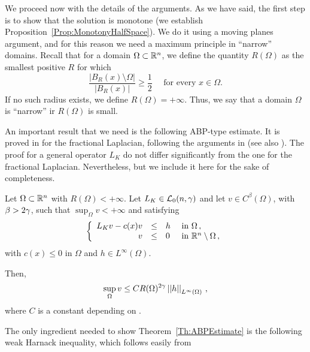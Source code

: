 We proceed now with the details of the arguments. As we have said, the first step is to show that the solution is monotone (we establish Proposition~\ref{Prop:MonotonyHalfSpace}). We do it using a moving planes argument, and for this reason we need a maximum principle in ``narrow'' domains. Recall that for a domain $\Omega \subset \mathbb{R}^n$, we define the quantity $R(\Omega)$ as the smallest positive $R$ for which
$$
\dfrac{|B_R(x)\setminus \Omega|}{|B_R(x)|}\geq \dfrac{1}{2} \quad \text{ for every } x \in \Omega.
$$
If no such radius exists, we define $R(\Omega) = +\infty$. Thus, we say that a domain $\Omega$ is ``narrow'' ir $R(\Omega)$ is small.


An important result that we need is the following ABP-type estimate. It is proved in \cite{QuaasXia} for the fractional Laplacian, following the arguments in \cite{Cabre-ABP} (see also \cite{Cabre-Topics}). The proof for a general operator $L_K$ do not differ significantly from the one for the fractional Laplacian. Nevertheless, but we include it here for the sake of completeness.

\begin{theorem}
	\label{Th:ABPEstimate}
	Let $\Omega \subset \mathbb{R}^n$ with $R(\Omega) < +\infty$. Let $L_K \in \mathcal{L}_0(n,\gamma)$ and let $v\in C^{\beta}(\Omega)$, with $\beta > 2\gamma$, such that $\sup_{\Omega} v < +\infty$ and satisfying
	$$
	\left\{\begin{array}{rcll}
	L_K v - c(x)v &\leq & h & \text{ in } \Omega\,, \\
	v & \leq & 0 & \text{ in } \mathbb{R}^n\setminus \Omega\,,
	\end{array} \right.
	$$
	with $c(x)\leq 0$ in $\Omega$ and $h\in L^\infty(\Omega)$.
	
	Then,
	$$
	\sup_\Omega v \leq C R(\Omega)^{2\gamma} \left | \left |{h} \right | \right |_{L^{\infty}(\Omega)}\,,
	$$
	where $C$ is a constant depending on .
\end{theorem}


The only ingredient needed to show Theorem~\ref{Th:ABPEstimate} is the following weak Harnack inequality, which follows easily from \cite{DiCastoKuusiPalatucci}


